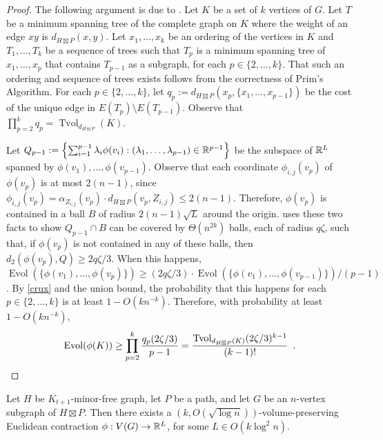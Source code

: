 \documentclass{patmorin}
\DeclareMathOperator{\evol}{Evol}
\DeclareMathOperator{\tvol}{Tvol}
\begin{document}
\begin{proof}
  The following argument is due to \citet{feige:approximating}.  Let $K$ be a set of $k$ vertices of $G$.  Let $T$ be a minimum spanning tree of the complete graph on $K$ where the weight of an edge $xy$ is $d_{H\boxtimes P}(x,y)$.  Let $x_1,\ldots,x_k$ be an ordering of the vertices in $K$ and $T_1,\ldots,T_k$ be a sequence of trees such that $T_{p}$ is a minimum spanning tree of $x_1,\ldots,x_{p}$ that contains $T_{p-1}$ as a subgraph, for each $p\in\{2,\ldots,k\}$.  That such an ordering and sequence of trees exists follows from the correctness of Prim's Algorithm. For each $p\in\{2,\ldots,k\}$, let $q_p:=d_{H\boxtimes P}(x_p,\{x_1,\ldots,x_{p-1}\})$ be the cost of the unique edge in $E(T_p)\setminus E(T_{p-1})$.  Observe that $\prod_{p=2}^k q_p = \tvol_{d_{H\boxtimes P}}(K)$.

  Let $Q_{p-1}:=\left\{\sum_{i=1}^{p-1}\lambda_i\phi(v_i):(\lambda_1,\ldots,\lambda_{p-1})\in\mathbb{R}^{p-1}\right\}$ be the subspace of $\mathbb{R}^L$ spanned by $\phi(v_1),\ldots,\phi(v_{p-1})$.  Observe that each coordinate $\phi_{i,j}(v_p)$ of $\phi(v_p)$ is at most $2(n-1)$, since $\phi_{i,j}(v_p)=\alpha_{Z_{i,j}}(v_p)\cdot d_{H\boxtimes P}(v_p, Z_{i,j})\le 2(n-1)$. Therefore, $\phi(v_p)$ is contained in a ball $B$ of radius $2(n-1)\sqrt{L}$ around the origin. \citet{feige:approximating} uses these two facts to show $Q_{p-1}\cap B$ can be covered by $\Theta(n^{2k})$ balls, each of radius $q\zeta$, such that, if $\phi(v_p)$ is not contained in any of these balls, then $d_2(\phi(v_p),Q)\ge 2q\zeta/3$.  When this happens, $\evol(\{\phi(v_1),\ldots,\phi(v_p)\})\ge (2q\zeta/3)\cdot\evol(\{\phi(v_1),\ldots,\phi(v_{p-1})\})/(p-1)$.  By \cref{crux} and the union bound, the probability that this happens for each $p\in\{2,\ldots,k\}$ is at least $1-O(kn^{-k})$.  Therefore, with probability at least $1-O(kn^{-k})$,
  \[
    \evol(\phi(K)) \ge \prod_{p=2}^{k}\frac{q_p(2\zeta/3)}{p-1} = \frac{\tvol_{d_{H\boxtimes P}(K)}(2\zeta/3)^{k-1}}{(k-1)!} \enspace . \qedhere
  \]
\end{proof}

\begin{thm}
  Let $H$ be $K_{t+1}$-minor-free graph, let $P$ be a path, and let $G$ be an $n$-vertex subgraph of $H\boxtimes P$.  Then there exists a $(k,O(\sqrt{\log n}))$-volume-preserving Euclidean contraction $\phi:V(G)\to\mathbb{R}^{L}$, for some $L\in O(k\log^2 n)$.
\end{thm}






\end{document}
